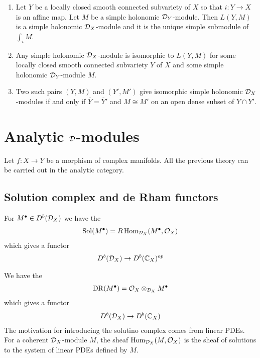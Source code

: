 \begin{theorem}
	\hfill
	\begin{enumerate}
		\item  Let $Y$ be a locally closed smooth connected subvariety of $X$
		      so that $i:Y\to X$ is an affine map. Let $M$ be a
		      simple holonomic ${\mathcal{D}}_Y$-module. Then $L(Y,M)$ is a simple holonomic
		      ${\mathcal{D}}_X$-module and it is the unique simple submodule of $\int_i M$.
		\item Any simple holonomic ${\mathcal{D}}_X$-module is isomorphic to $L(Y,M)$ for some
		      locally closed smooth connected subvariety $Y$ of $X$ and some simple holonomic ${\mathcal{D}}_Y$-module $M$.
		\item Two such pairs $(Y,M)$ and $(Y',M')$ give isomorphic simple holonomic ${\mathcal{D}}_X$-modules if and only if
		      $\overline Y = \overline Y'$ and $M\cong M'$ on an open dense subset of $Y\cap Y'$.
	\end{enumerate}
\end{theorem}

\section{Analytic ${\mathcal{D}}$-modules}
Let $f:X\to Y$ be a morphism of complex manifolds. All the previous theory can be carried out in the analytic category.
\subsection{Solution complex and de Rham functors}
For $M^\bullet \in D^b({\mathcal{D}}_X)$ we have the  \begin{align*}
	\operatorname{Sol}(M^\bullet) = R\operatorname{Hom}_{{\mathcal{D}}_X}(M^\bullet,{\mathcal{O}}_X)
\end{align*} which gives a functor \begin{align*}
	D^b({\mathcal{D}}_X) \to D^b(\mathbb{C}_X)^{op}
\end{align*}

We have the  \begin{align*}
	\operatorname{DR}(M^\bullet) = {\mathcal{O}}_X\otimes_{{\mathcal{D}}_X} M^\bullet
\end{align*} which gives a functor \begin{align*}
	D^b({\mathcal{D}}_X) \to D^b(\mathbb{C}_X)
\end{align*} The motivation for introducing the solutino complex
comes from linear PDEs. For a coherent ${\mathcal{D}}_X$-module $M$, the sheaf $\operatorname{Hom}_{{\mathcal{D}}_X}(M,{\mathcal{O}}_X)$ is the sheaf of solutions
to the system of linear PDEs defined by $M$.


